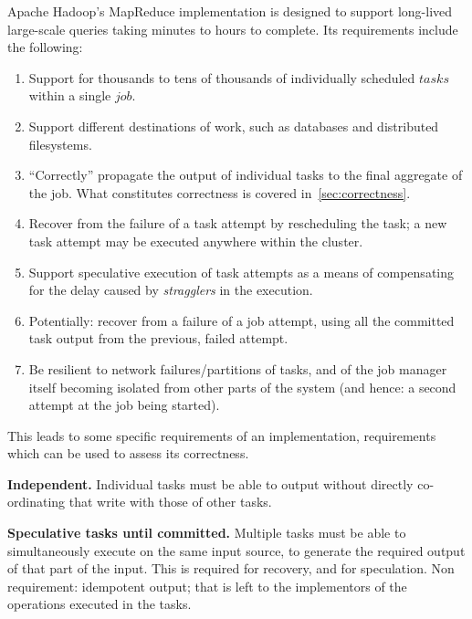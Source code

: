 \documentclass[format=acmsmall, screen=true, review=false]{acmart}
\begin{document}
Apache Hadoop's MapReduce implementation is designed to support long-lived
large-scale queries taking minutes to hours to complete.
Its requirements include the following:

\begin{enumerate}

  \item Support for thousands to tens of thousands of individually scheduled $tasks$
  within a single $job$.

  \item Support different destinations of work, such as databases and
  distributed filesystems.

  \item ``Correctly'' propagate the output of individual tasks to the final
  aggregate of the job.
  What constitutes correctness is covered in\ \ref{sec:correctness}.

  \item Recover from the failure of a task attempt by rescheduling the task;
  a new task attempt may be executed anywhere within the cluster.

  \item Support speculative execution of task attempts as a means of compensating for the
  delay caused by \emph{stragglers} in the execution.

  \item Potentially: recover from a failure of a job attempt, using all the committed
  task output from the previous, failed attempt.

  \item Be resilient to network failures/partitions of tasks, and of the job manager
  itself becoming isolated from other parts of the system (and hence: a second
  attempt at the job being started).

\end{enumerate}

This leads to some specific requirements of an implementation, requirements
which can be used to assess its correctness.

\textbf{Independent.}
Individual tasks must be able to output without directly
co-ordinating that write with those of other tasks.

\textbf{Speculative tasks until committed.}
Multiple tasks must be able to simultaneously execute on the same input
source, to generate the required output of that part of the input.
This is required for recovery, and for speculation.
Non requirement: idempotent output;
that is left to the implementors of the operations executed in the tasks.
\end{document}
